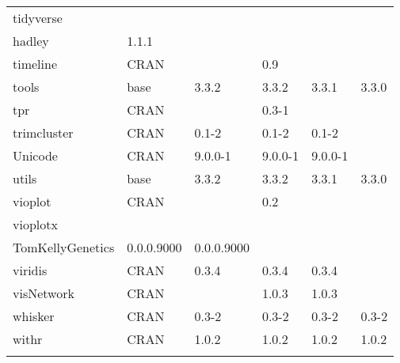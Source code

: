 \begin{longtable}{|llllll|}
tidyverse                     & \begin{tabular}[c]{@{}l@{}}GitHub \\ hadley \end{tabular}            & 1.1.1       &             &                &                   \\ \hline \rowcolor{gray!25}
timeline                      & CRAN                      &             & 0.9         &                &                  \\ \hline
tools                         & base                      & 3.3.2       & 3.3.2       & 3.3.1          & 3.3.0             \\ \hline \rowcolor{gray!25}
tpr                           & CRAN                      &             & 0.3-1       &                &                  \\ \hline
trimcluster                   & CRAN                      & 0.1-2       & 0.1-2       & 0.1-2          &                   \\ \hline \rowcolor{gray!25}
Unicode                       & CRAN                      & 9.0.0-1     & 9.0.0-1     & 9.0.0-1        &                  \\ \hline
utils                         & base                      & 3.3.2       & 3.3.2       & 3.3.1          & 3.3.0             \\ \hline \rowcolor{gray!25}
vioplot                       & CRAN                      &             & 0.2         &                &                  \\ \hline
vioplotx                      & \begin{tabular}[c]{@{}l@{}}GitHub \\ TomKellyGenetics \end{tabular}  & 0.0.0.9000  & 0.0.0.9000  &                &                   \\ \hline \rowcolor{gray!25}
viridis                       & CRAN                      & 0.3.4       & 0.3.4       & 0.3.4          &                  \\ \hline
visNetwork                    & CRAN                      &             & 1.0.3       & 1.0.3          &                   \\ \hline \rowcolor{gray!25}
whisker                       & CRAN                      & 0.3-2       & 0.3-2       & 0.3-2          & 0.3-2            \\ \hline
withr                         & CRAN                      & 1.0.2       & 1.0.2       & 1.0.2          & 1.0.2             \\ \hline \rowcolor{gray!25}

\end{longtable}

